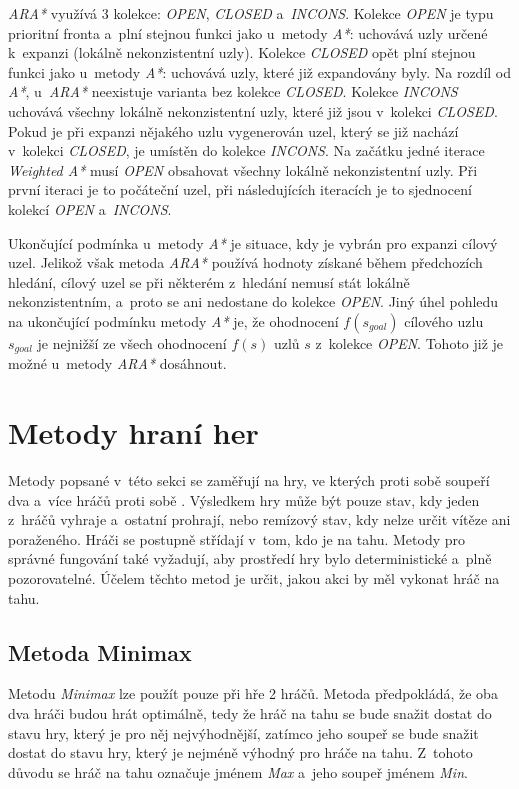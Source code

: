 \emph{ARA*} využívá 3 kolekce: \emph{OPEN}, \emph{CLOSED} a~\emph{INCONS}. Kolekce \emph{OPEN} je typu prioritní fronta a~plní stejnou funkci jako u~metody \emph{A*}: uchovává uzly určené k~expanzi (lokálně nekonzistentní uzly). Kolekce \emph{CLOSED} opět plní stejnou funkci jako u~metody \emph{A*}: uchovává uzly, které již expandovány byly. Na rozdíl od \emph{A*}, u~\emph{ARA*} neexistuje varianta bez kolekce \emph{CLOSED}. Kolekce \emph{INCONS} uchovává všechny lokálně nekonzistentní uzly, které již jsou v~kolekci \emph{CLOSED}. Pokud je při expanzi nějakého uzlu vygenerován uzel, který se již nachází v~kolekci \emph{CLOSED}, je umístěn do kolekce \emph{INCONS}. Na začátku jedné iterace \emph{Weighted A*} musí \emph{OPEN} obsahovat všechny lokálně nekonzistentní uzly. Při první iteraci je to počáteční uzel, při následujících iteracích je to sjednocení kolekcí \emph{OPEN} a~\emph{INCONS}.

Ukončující podmínka u~metody \emph{A*} je situace, kdy je vybrán pro expanzi cílový uzel. Jelikož však metoda \emph{ARA*} používá hodnoty získané během předchozích hledání, cílový uzel se při některém z~hledání nemusí stát lokálně nekonzistentním, a~proto se ani nedostane do kolekce \emph{OPEN}. Jiný úhel pohledu na ukončující podmínku metody \emph{A*} je, že ohodnocení $f(s_{goal})$ cílového uzlu $s_{goal}$ je nejnižší ze všech ohodnocení $f(s)$ uzlů $s$ z~kolekce \emph{OPEN}. Tohoto již je možné u~metody \emph{ARA*} dosáhnout.

\section{Metody hraní her}

Metody popsané v~této sekci se zaměřují na hry, ve kterých proti sobě soupeří dva a~více hráčů proti sobě \cite{AI_Russel_Norvig}. Výsledkem hry může být pouze stav, kdy jeden z~hráčů vyhraje a~ostatní prohrají, nebo remízový stav, kdy nelze určit vítěze ani poraženého. Hráči se postupně střídají v~tom, kdo je na tahu. Metody pro správné fungování také vyžadují, aby prostředí hry bylo deterministické a~plně pozorovatelné. Účelem těchto metod je určit, jakou akci by měl vykonat hráč na tahu.

\subsection*{Metoda Minimax}

Metodu \emph{Minimax} \cite{AI_Russel_Norvig} lze použít pouze při hře 2 hráčů. Metoda předpokládá, že oba dva hráči budou hrát optimálně, tedy že hráč na tahu se bude snažit dostat do stavu hry, který je pro něj nejvýhodnější, zatímco jeho soupeř se bude snažit dostat do stavu hry, který je nejméně výhodný pro hráče na tahu. Z~tohoto důvodu se hráč na tahu označuje jménem \emph{Max} a~jeho soupeř jménem \emph{Min}.

